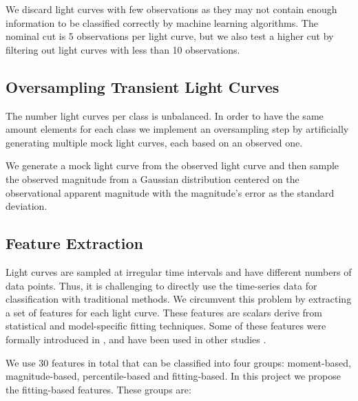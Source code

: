 \documentclass[a4paper,fleqn,usenatbib]{mnras}
\begin{document}
We discard light curves with few observations as they may not contain
enough information to be classified correctly by machine learning
algorithms.  
The nominal cut is 5 observations per light curve, but we also test a
higher cut by filtering out light curves with less than 10 observations.

\subsection{Oversampling Transient Light Curves} \label{subsection_oversampling}

The number light curves per class is unbalanced. 
In order to have the same amount elements for each class we implement an
oversampling step by artificially generating multiple mock light curves,
each based on an observed one. 

We generate a mock light curve from the observed light curve and 
then sample the observed magnitude from a Gaussian distribution
centered on the observational apparent magnitude with the magnitude's
error as the  standard deviation. 


\subsection{Feature Extraction} \label{subsection_extraction}

Light curves are sampled at irregular time intervals and have
different numbers of data points.
Thus, it is challenging to directly use the time-series data for
classification with traditional methods.
We circumvent this problem by extracting a set of features for each
light curve.
These features are scalars derive from statistical and model-specific
fitting techniques.
Some of these features were formally introduced in
\cite{1101.1959}, and have been used in other studies
\citep{1603.00882,1601.03931}.  

We use 30 features in total that can be classified into four groups:
moment-based, magnitude-based, percentile-based and fitting-based. 
In this project we propose the fitting-based features.
These groups are:
\end{document}
